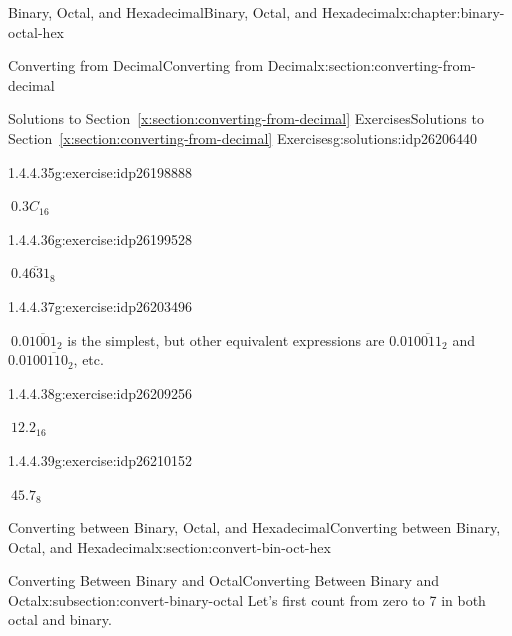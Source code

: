 \documentclass[twoside,10pt,]{book}
\newcommand{\xreffont}{\relax}
\numberwithin{equation}{section}
\begin{document}
\begin{chapterptx}{Binary, Octal, and Hexadecimal}{}{Binary, Octal, and Hexadecimal}{}{}{x:chapter:binary-octal-hex}
\begin{sectionptx}{Converting from Decimal}{}{Converting from Decimal}{}{}{x:section:converting-from-decimal}
\begin{solutions-subsection}{Solutions to Section~{\xreffont\ref*{x:section:converting-from-decimal}} Exercises}{}{Solutions to Section~{\xreffont\ref*{x:section:converting-from-decimal}} Exercises}{}{}{g:solutions:idp26206440}
\begin{exercisegroup}
\begin{divisionsolutioneg}{1.4.4.35}{}{g:exercise:idp26198888}
\par\smallskip%
\noindent\hypertarget{g:solution:idp26203112-main}{}\(\ 0.3C_{16}\)\end{divisionsolutioneg}%
\begin{divisionsolutioneg}{1.4.4.36}{}{g:exercise:idp26199528}%
\par\smallskip%
\noindent\hypertarget{g:solution:idp26196328-main}{}\(\ 0.\overline{4631}_8\)\end{divisionsolutioneg}%
\begin{divisionsolutioneg}{1.4.4.37}{}{g:exercise:idp26203496}%
\par\smallskip%
\noindent\hypertarget{g:solution:idp26196712-main}{}\(\ 0.0\overline{1001}_2\) is the simplest, but other equivalent expressions are \(0.01\overline{0011}_2\) and \(0.010\overline{0110}_2\), etc.\end{divisionsolutioneg}%
\begin{divisionsolutioneg}{1.4.4.38}{}{g:exercise:idp26209256}%
\par\smallskip%
\noindent\hypertarget{g:solution:idp26211048-main}{}\(\ 12.2_{16}\)\end{divisionsolutioneg}%
\begin{divisionsolutioneg}{1.4.4.39}{}{g:exercise:idp26210152}%
\par\smallskip%
\noindent\hypertarget{g:solution:idp26207208-main}{}\(\ 45.7_8\)\end{divisionsolutioneg}%
\end{exercisegroup}
\par\medskip\noindent
\end{solutions-subsection}
\end{sectionptx}
%
%
\typeout{************************************************}
\typeout{************************************************}
%
\begin{sectionptx}{Converting between Binary, Octal, and Hexadecimal}{}{Converting between Binary, Octal, and Hexadecimal}{}{}{x:section:convert-bin-oct-hex}
%
%
\typeout{************************************************}
\typeout{************************************************}
%
\begin{subsectionptx}{Converting Between Binary and Octal}{}{Converting Between Binary and Octal}{}{}{x:subsection:convert-binary-octal}
Let's first count from zero to 7 in both octal and binary. \begin{center}%

\end{center}
\end{subsectionptx}
\end{sectionptx}
\end{chapterptx}
\end{document}
